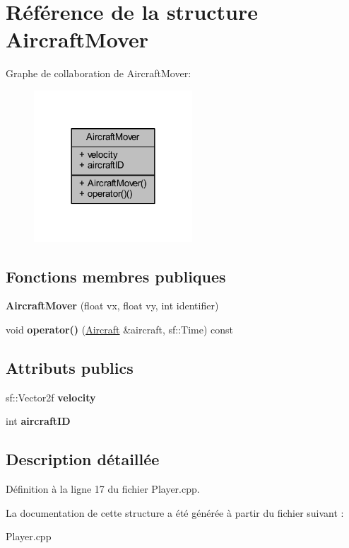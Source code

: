 \hypertarget{struct_aircraft_mover}{}\section{Référence de la structure Aircraft\+Mover}
\label{struct_aircraft_mover}


Graphe de collaboration de Aircraft\+Mover\+:\nopagebreak
\begin{figure}[H]
\begin{center}
\leavevmode
\includegraphics[width=168pt]{struct_aircraft_mover__coll__graph}
\end{center}
\end{figure}
\subsection*{Fonctions membres publiques}
\begin{DoxyCompactItemize}
\item 
\hypertarget{struct_aircraft_mover_a43c29f97d2dd0ba1254b22babb82474f}{}\label{struct_aircraft_mover_a43c29f97d2dd0ba1254b22babb82474f} 
{\bfseries Aircraft\+Mover} (float vx, float vy, int identifier)
\item 
\hypertarget{struct_aircraft_mover_abad36338ec9f30e35e29b725ad731697}{}\label{struct_aircraft_mover_abad36338ec9f30e35e29b725ad731697} 
void {\bfseries operator()} (\hyperlink{class_aircraft}{Aircraft} \&aircraft, sf\+::\+Time) const
\end{DoxyCompactItemize}
\subsection*{Attributs publics}
\begin{DoxyCompactItemize}
\item 
\hypertarget{struct_aircraft_mover_a8403de0c4c7e057e7a47c6d38f621468}{}\label{struct_aircraft_mover_a8403de0c4c7e057e7a47c6d38f621468} 
sf\+::\+Vector2f {\bfseries velocity}
\item 
\hypertarget{struct_aircraft_mover_ab7153fc0bacb3262cb04cbf20798c751}{}\label{struct_aircraft_mover_ab7153fc0bacb3262cb04cbf20798c751} 
int {\bfseries aircraft\+ID}
\end{DoxyCompactItemize}


\subsection{Description détaillée}


Définition à la ligne 17 du fichier Player.\+cpp.



La documentation de cette structure a été générée à partir du fichier suivant \+:\begin{DoxyCompactItemize}
\item 
Player.\+cpp\end{DoxyCompactItemize}
